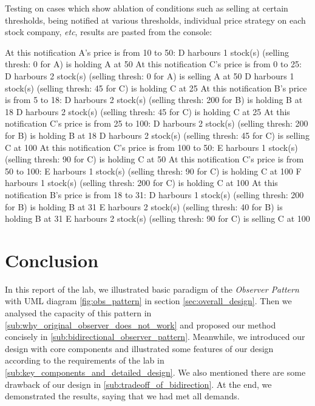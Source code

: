 \documentclass[a4paper]{article}
\begin{document}
Testing on cases which show ablation of conditions such as selling at certain thresholds,
being notified at various thresholds, individual price strategy on each stock company,
\textit{etc}, results are pasted from the console:

\begin{boxedverbatim}
At this notification A's price is from 10 to 50:
D harbours 1 stock(s) (selling thresh: 0 for A) is holding A at 50
At this notification C's price is from 0 to 25:
D harbours 2 stock(s) (selling thresh: 0 for A) is selling A at 50
D harbours 1 stock(s) (selling thresh: 45 for C) is holding C at 25
At this notification B's price is from 5 to 18:
D harbours 2 stock(s) (selling thresh: 200 for B) is holding B at 18
D harbours 2 stock(s) (selling thresh: 45 for C) is holding C at 25
At this notification C's price is from 25 to 100:
D harbours 2 stock(s) (selling thresh: 200 for B) is holding B at 18
D harbours 2 stock(s) (selling thresh: 45 for C) is selling C at 100
At this notification C's price is from 100 to 50:
E harbours 1 stock(s) (selling thresh: 90 for C) is holding C at 50
At this notification C's price is from 50 to 100:
E harbours 1 stock(s) (selling thresh: 90 for C) is holding C at 100
F harbours 1 stock(s) (selling thresh: 200 for C) is holding C at 100
At this notification B's price is from 18 to 31:
D harbours 1 stock(s) (selling thresh: 200 for B) is holding B at 31
E harbours 2 stock(s) (selling thresh: 40 for B) is holding B at 31
E harbours 2 stock(s) (selling thresh: 90 for C) is selling C at 100
\end{boxedverbatim}

\section{Conclusion}%
\label{sec:conclusion}

In this report of the lab, we illustrated basic paradigm
of the \textit{Observer Pattern} with UML diagram \ref{fig:obs_pattern} in
section \ref{sec:overall_design}. Then we analysed the capacity
of this pattern in \ref{sub:why_original_observer_does_not_work}
and proposed our method concisely in \ref{sub:bidirectional_observer_pattern}.
Meanwhile, we introduced our design with core components and
illustrated some features of our design according to the
requirements of the lab in \ref{sub:key_components_and_detailed_design}.
We also mentioned there are some drawback of our design
in \ref{sub:tradeoff_of_bidirection}. At the
end, we demonstrated the results, saying that we had met all demands.
\end{document}
